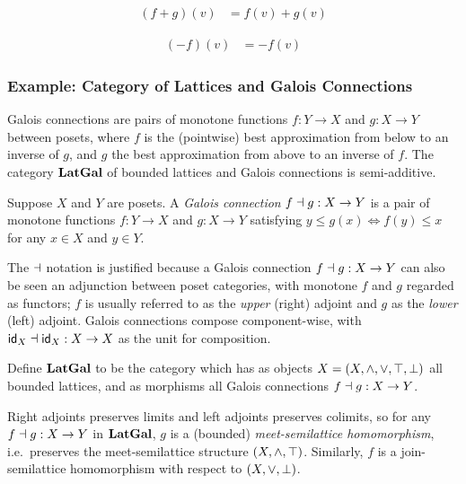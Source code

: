 \vspace{-4mm}
\begin{center}
\begin{minipage}[t]{0.35\textwidth}
\begin{align*}
(f + g)(v) &= f(v) + g(v)
\end{align*}
\end{minipage}%
\begin{minipage}[t]{0.35\textwidth}
\begin{align*}
(-f)(v) &= -f(v)
\end{align*}
\end{minipage}
\end{center}

\subsubsection{Example: Category of Lattices and Galois Connections}

 Galois connections are pairs of monotone functions $f: Y \to X$ and
$g: X \to Y$ between posets, where $f$ is the (pointwise) best approximation from below to an inverse of $g$,
and $g$ the best approximation from above to an inverse of $f$. The category $\mathbf{LatGal}$ of bounded lattices and
Galois connections is semi-additive.

\begin{definition}
Suppose $X$ and $Y$ are posets. A \emph{Galois connection} $f \dashv g: X \to Y$ is a pair of monotone functions
$f: Y \to X$ and $g: X \to Y$ satisfying $y \leq g(x) \iff f(y) \leq x$ for any $x \in X$ and $y \in Y$.
\end{definition}

\noindent The $\dashv$ notation is justified because a Galois connection $f \dashv g: X \to Y$ can also be seen an
adjunction between poset categories, with monotone $f$ and $g$ regarded as functors; $f$ is usually referred
to as the \emph{upper} (right) adjoint and $g$ as the \emph{lower} (left) adjoint. Galois connections compose
component-wise, with $\mathsf{id}_X \dashv \mathsf{id}_X: X \to X$ as the unit for composition.

\begin{definition}
Define $\mathbf{LatGal}$ to be the category which has as objects $X = (X, \wedge, \vee, \top, \bot)$ all bounded
lattices, and as morphisms all Galois connections $f \dashv g: X \to Y$.
\end{definition}

\noindent Right adjoints preserves limits and left adjoints preserves colimits, so for any $f \dashv g: X \to Y$
in $\mathbf{LatGal}$, $g$ is a (bounded) \emph{meet-semilattice homomorphism}, i.e.~preserves the meet-semilattice
structure $(X, \wedge, \top)$. Similarly, $f$ is a join-semilattice homomorphism with respect to $(X, \vee,
\bot)$.

